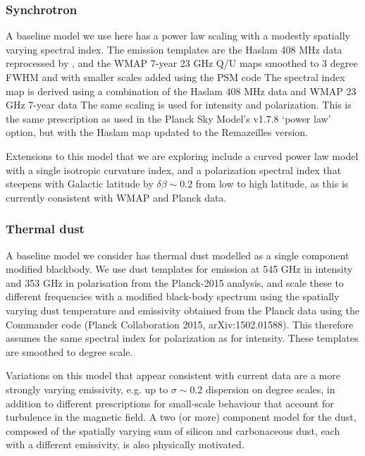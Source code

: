 \subsubsection{Synchrotron}

A baseline model we use here has a power law scaling with a modestly spatially varying spectral index.  The emission templates are the Haslam 408 MHz data reprocessed by \cite{remazeilles/etal:2015}, 
and the WMAP 7-year 23 GHz Q/U maps \cite{jarosik/etal:2011}
smoothed to 3 degree FWHM and with smaller scales added using the PSM code \cite{delabrouille/etal:2013}
The spectral index map is derived using a combination of the Haslam 
408 MHz data and WMAP 23 GHz 7-year data \cite{miville-Deschenes/etal:2008}
The same scaling is used for intensity and polarization.  This is the same prescription as used in the Planck Sky Model's v1.7.8 `power law' option, but with the Haslam map updated to the Remazeilles version. 

Extensions to this model that we are exploring include a curved power 
law model with a single isotropic curvature index, and a polarization spectral index that steepens with Galactic latitude by $\delta \beta \sim 0.2$ from low to high latitude, as this is currently consistent with WMAP and Planck data. 

\subsubsection{Thermal dust}
A baseline model we consider has thermal dust modelled as a single component modified  blackbody. We use dust templates for emission at 545 GHz in intensity and 
 353 GHz in polarisation from the Planck-2015 analysis, and scale these to different  frequencies with a modified black-body spectrum using the spatially varying dust temperature and emissivity obtained from the Planck data using the Commander code (Planck Collaboration  2015, arXiv:1502.01588). This therefore assumes the same spectral index for  polarization as for intensity.  These templates are smoothed to degree scale.

Variations on this model that appear consistent with current data are a more strongly varying emissivity, e.g. up to $\sigma \sim 0.2$ dispersion on degree scales,  in addition to different prescriptions for small-scale behaviour that account for turbulence in the magnetic field. A two (or more) component model for the dust, composed of the spatially varying sum of silicon and carbonaceous dust, each with a different emissivity, is also physically motivated.

